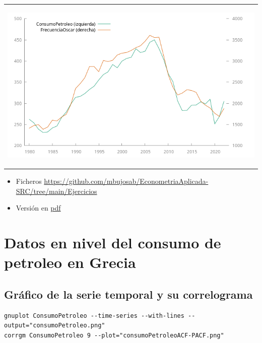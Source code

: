 \documentclass[10pt]{article}
\begin{document}
\begin{center}
\begin{tabular}{l}
\begin{center}
\includegraphics[width=.9\linewidth]{./NombreOscarYConsumoDePetroleo/PetroleoOscar.png}
\end{center}\\
\end{tabular}
\end{center}


\begin{itemize}
\item Ficheros \url{https://github.com/mbujosab/EconometriaAplicada-SRC/tree/main/Ejercicios}
\item Versión en \href{https://github.com/mbujosab/EconometriaAplicada-SRC/blob/main/NombreOscarYConsumoDePetroleo.pdf}{pdf}
\end{itemize}
\section*{Datos en nivel del consumo de petroleo en Grecia}
\label{sec:org38d97da}
\subsection*{Gráfico de la serie temporal y su correlograma}
\label{sec:org0b085ee}

\begin{verbatim}
gnuplot ConsumoPetroleo --time-series --with-lines --output="consumoPetroleo.png"
corrgm ConsumoPetroleo 9 --plot="consumoPetroleoACF-PACF.png"
\end{verbatim}
\end{document}
